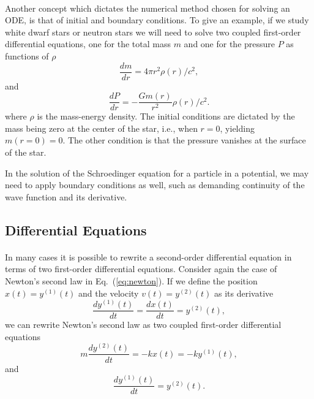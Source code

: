 \documentclass[%
oneside,                 %
final,                   %
10pt]{article}
\begin{document}
\paragraph{}
Another concept which dictates the numerical method chosen
for solving an ODE, is that of initial and boundary conditions.
To give an example, if we study white dwarf stars or neutron stars
we will need to solve two coupled first-order differential
equations, one for the total mass $m$ and one for the 
pressure $P$ as functions of 
$\rho$ 
\[
\frac{dm}{dr}=4\pi r^{2}\rho (r)/c^2,
\]
and
\[
\frac{dP}{dr}=-\frac{Gm(r)}{r^{2}}\rho (r)/c^2.
\]
where $\rho$ is the mass-energy density.
The initial conditions are dictated by the mass being
zero at the center of the star, i.e., when $r=0$,
yielding $m(r=0)=0$. The other condition is that
the pressure vanishes at the surface of the star.

In the solution of the Schroedinger equation for a particle
in a potential, we may need to apply boundary conditions as well,
such as demanding continuity of the wave function and its derivative.



\subsection{Differential Equations}

\paragraph{}
In many cases it is possible to rewrite a second-order
differential equation in terms of two first-order differential
equations. Consider again the case of Newton's second law in Eq.~(\ref{eq:newton}). If we define the position $x(t)=y^{(1)}(t)$ 
and the velocity $v(t)=y^{(2)}(t)$ as its derivative 
\begin{equation} 
   \frac{dy^{(1)}(t)}{dt}=\frac{dx(t)}{dt}=y^{(2)}(t),
\end{equation}
we can rewrite Newton's second law as two coupled first-order
differential equations
\begin{equation} 
   m\frac{dy^{(2)}(t)}{dt}=-kx(t)=-ky^{(1)}(t),
    \label{eq:n1}
\end{equation}
and 
\begin{equation}
\frac{dy^{(1)}(t)}{dt}=y^{(2)}(t). \label{eq:n2}
\end{equation}
\end{document}
